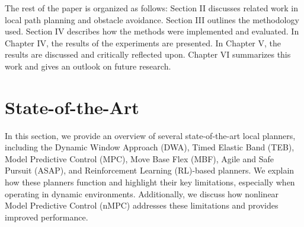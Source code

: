 \documentclass[conference]{IEEEtran}
\begin{document}



The rest of the paper is organized as follows: Section II discusses related work in local path planning and obstacle avoidance. Section III outlines the methodology used. Section IV describes how the methods were implemented and evaluated. In Chapter IV, the results of the experiments are presented. In Chapter V, the results are discussed and critically reflected upon. Chapter VI summarizes this work and gives an outlook on future research.

\section{State-of-the-Art}

In this section, we provide an overview of several state-of-the-art local planners, including the Dynamic Window Approach (DWA), Timed Elastic Band (TEB), Model Predictive Control (MPC), Move Base Flex (MBF), Agile and Safe Pursuit (ASAP), and Reinforcement Learning (RL)-based planners. We explain how these planners function and highlight their key limitations, especially when operating in dynamic environments. Additionally, we discuss how nonlinear Model Predictive Control (nMPC) addresses these limitations and provides improved performance.
\end{document}
